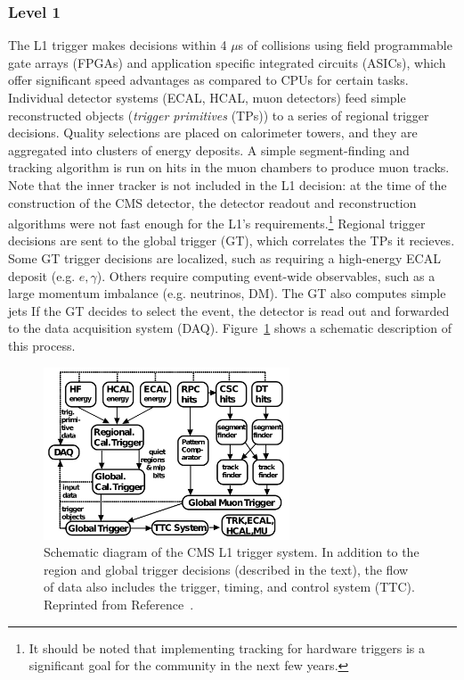 \subsubsection{Level 1}

The L1 trigger makes decisions within 4 $\mu$s of collisions using field programmable gate arrays (FPGAs) and application specific integrated circuits (ASICs), which offer significant speed advantages as compared to CPUs for certain tasks.
Individual detector systems (ECAL, HCAL, muon detectors) feed simple reconstructed objects (\emph{trigger primitives} (TPs)) to a series of regional trigger decisions.
Quality selections are placed on calorimeter towers, and they are aggregated into clusters of energy deposits.
A simple segment-finding and tracking algorithm is run on hits in the muon chambers to produce muon tracks.
Note that the inner tracker is not included in the L1 decision: at the time of the construction of the CMS detector, the detector readout and reconstruction algorithms were not fast enough for the L1's requirements.\footnote{It should be noted that implementing tracking for hardware triggers is a significant goal for the community in the next few years.}
Regional trigger decisions are sent to the global trigger (GT), which correlates the TPs it recieves.
Some GT trigger decisions are localized, such as requiring a high-energy ECAL deposit (e.g. $e,\gamma$).
Others require computing event-wide observables, such as a large momentum imbalance (e.g. neutrinos, DM).
The GT also computes simple jets
If the GT decides to select the event, the detector is read out and forwarded to the data acquisition system (DAQ).
Figure~\ref{fig:cms:l1} shows a schematic description of this process.

\begin{figure}[]
\begin{center}
	\includegraphics[width=0.65\textwidth]{figures/cms/l1.png}
	\caption{Schematic diagram of the CMS L1 trigger system.
			 In addition to the region and global trigger decisions (described in the text), the flow of data also includes the trigger, timing, and control system (TTC).
				Reprinted from Reference~\cite{cmstrig}.}
	\label{fig:cms:l1}
\end{center}
\end{figure}

